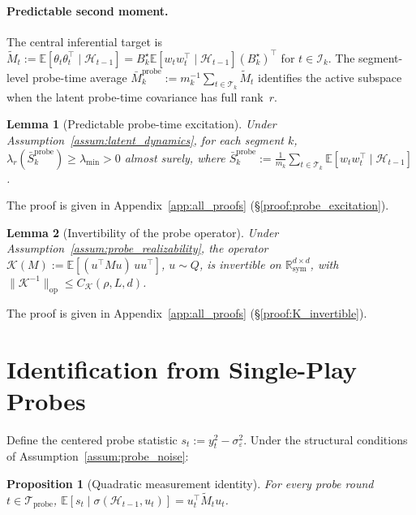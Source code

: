 \documentclass{article}
\newcommand{\R}{\mathbb{R}}
\newcommand{\E}{\mathbb{E}}
\newcommand{\op}{\mathrm{op}}
\newcommand{\cH}{\mathcal{H}}
\newcommand{\cT}{\mathcal{T}}
\newcommand{\cI}{\mathcal{I}}
\newcommand{\cTprobe}{\mathcal{T}_{\mathrm{probe}}}
\newtheorem{lemma}{Lemma}
\newtheorem{proposition}{Proposition}
\begin{document}
\paragraph{Predictable second moment.}
The central inferential target is $\widetilde{M}_t := \E[\theta_t \theta_t^\top \mid \cH_{t-1}] = B_k^\star \E[w_t w_t^\top \mid \cH_{t-1}] (B_k^\star)^\top$ for $t \in \cI_k$.
The segment-level probe-time average $\bar{M}_k^{\mathrm{probe}} := m_k^{-1} \sum_{t \in \cT_k} \widetilde{M}_t$ identifies the active subspace when the latent probe-time covariance has full rank~$r$.

\begin{lemma}[Predictable probe-time excitation]
\label{lem:probe_excitation}
Under Assumption~\ref{assum:latent_dynamics}, for each segment $k$,
$\lambda_r(\bar S_k^{\mathrm{probe}})\ge \lambda_{\min} > 0$ almost surely,
where $\bar S_k^{\mathrm{probe}} := \frac{1}{m_k}\sum_{t\in \cT_k}\E[w_t w_t^\top \mid \cH_{t-1}]$.
\end{lemma}

The proof is given in Appendix~\ref{app:all_proofs} (\S\ref{proof:probe_excitation}).

\begin{lemma}[Invertibility of the probe operator]
\label{lem:K_invertible}
Under Assumption~\ref{assum:probe_realizability}, the operator
$\mathcal K(M):=\E[(u^\top M u)\,uu^\top]$, $u\sim Q$,
is invertible on $\R_{\mathrm{sym}}^{d\times d}$, with $\|\mathcal K^{-1}\|_{\op} \le C_{\mathcal K}(\rho, L, d)$.
\end{lemma}

The proof is given in Appendix~\ref{app:all_proofs} (\S\ref{proof:K_invertible}).

\section{Identification from Single-Play Probes}
\label{sec:identification}

Define the centered probe statistic $s_t := y_t^2 - \sigma_\varepsilon^2$.
Under the structural conditions of Assumption~\ref{assum:probe_noise}:

\begin{proposition}[Quadratic measurement identity]
  \label{prop:quad}
  For every probe round $t \in \cTprobe$,
  $\E[s_t \mid \sigma(\cH_{t-1}, u_t)] = u_t^\top \widetilde{M}_t u_t$.
\end{proposition}
\end{document}
